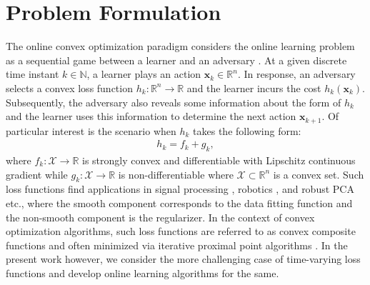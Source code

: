 \documentclass[draftcls,onecolumn,12pt]{IEEEtran}
\theoremstyle{plain}
\def\x{\mathbf{x}}
\def\cX {\mathcal{X}}
\def\Rn{\mathbb{R}}
\def\N{\mathbb{N}}
\theoremstyle{plain}
\theoremstyle{remark}
\begin{document}
 	 
	 

	

\section{Problem Formulation}\label{Prob_for}
The online convex optimization paradigm considers the online learning problem as a sequential game between a learner and an adversary \cite{zinkevich2003online}. At a given discrete time instant $k\in\N$, a learner plays an action $\x_k\in\Rn^n$. In response, an adversary selects a convex loss function $h_k:\Rn^n\rightarrow \Rn$ and the learner incurs the cost $h_k(\x_k)$. Subsequently, the adversary also reveals some information about the form of $h_k$ and the learner uses this information to determine the next action $\x_{k+1}$. Of particular interest is the scenario when $h_k$ takes the following form:
\begin{align}\label{main}
h_k = f_k + g_k,
\end{align}
where $f_k :\cX\rightarrow\Rn$ is strongly convex and differentiable with Lipschitz continuous gradient while $g_k :\cX\rightarrow\Rn $ is non-differentiable where $\cX \subset \Rn^n$ is a convex set. Such loss functions find applications in signal processing \cite{duchi2017stochastic,simonetto2015non}, robotics \cite{derenick2007convex}, and robust PCA   \cite{he2012incremental,qiu2011reprocs,kasai2016network} etc., where the smooth component corresponds to the data fitting function and the non-smooth component is the regularizer. In the context of convex optimization algorithms, such loss functions are referred to as convex composite functions and often minimized via iterative proximal point algorithms \cite{nedic2017stochastic}. In the present work however, we consider the more challenging case of time-varying loss functions and develop online learning algorithms for the same. 
\end{document}
